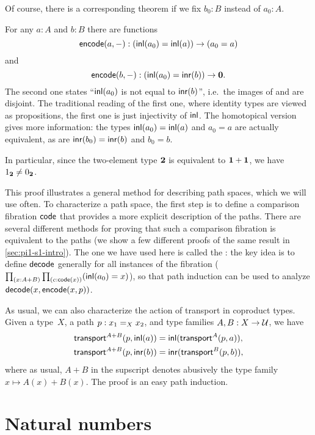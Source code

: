 \noindent
Of course, there is a corresponding theorem if we fix $b_0:B$ instead of $a_0:A$.

For any $a : A$ and $b : B$ there are functions
%
\[ \encode(a, {-}) : (\inl(a_0)=\inl(a)) \to (a_0=a)\]
%
and
%
\[ \encode(b, {-}) : (\inl(a_0)=\inr(b)) \to \emptyt. \]
%
The second one states
``$\inl(a_0)$ is not equal to $\inr(b)$'', i.e.\ the images of \inl and \inr are disjoint. The traditional reading of the first one, where identity types are viewed as propositions, the first one is just injectivity of $\inl$.  The
homotopical version gives more information: the types $\inl(a_0)=\inl(a)$ and
$a_0=a$ are actually equivalent, as are $\inr(b_0)=\inr(b)$ and $b_0=b$.

\begin{rmk}\label{rmk:true-neq-false}
In particular, since the two-element type $\bool$ is equivalent to $\unit+\unit$, we have $\btrue\neq\bfalse$.
\end{rmk}

This proof illustrates a general method for describing path spaces, which we will use often.  To characterize a path space, the first step is to define a comparison fibration $\code$ that provides a more explicit description of the paths.  There are several different methods for proving that such a comparison fibration is equivalent to the paths (we show a few different proofs of the same result in \autoref{sec:pi1-s1-intro}).  The one we have used here is called the :
the key idea is to define $\decode$ generally for all instances of the fibration ($\prd{x:A+B}{c:\code(x)} (\inl(a_0)=x)$), so that path induction can be used to analyze $\decode(x,\encode(x,p))$.  

As usual, we can also characterize the action of transport in coproduct types.
Given a type~$X$, a path $p:\id[X]{x_1}{x_2}$, and type families $A,B:X\to\type$, we have
\begin{align*}
  \transfib{A+B}{p}{\inl(a)} &= \inl (\transfib{A}{p}{a}),\\
  \transfib{A+B}{p}{\inr(b)} &= \inr (\transfib{B}{p}{b}),
\end{align*}
where as usual, $A+B$ in the supscript denotes abusively the type family $x\mapsto A(x)+B(x)$.
The proof is an easy path induction.

%

\section{Natural numbers}
\label{sec:compute-nat}

